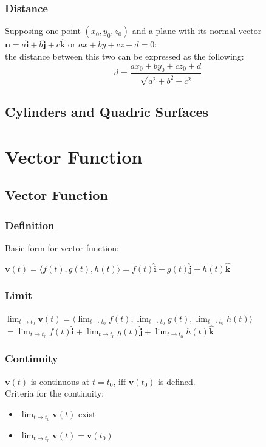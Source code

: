 \documentclass[UTF8,a4paper, 10pt, openany]{book}
\begin{document}
\subsection{Distance}
Supposing one point $(x_0,y_0,z_0)$ and a plane with its normal vector $\mathbf{n}=a\mathbf{\hat{i}}+b\mathbf{\hat{j}}+c\mathbf{\hat{k}}$ or $ax+by+cz+d=0$:\\
the distance between this two can be expressed as the following:
\begin{equation}
\boxed{d=\dfrac{ax_0+by_0+cz_0+d}{\sqrt{a^2+b^2+c^2}}}
\end{equation}

\section{Cylinders and Quadric Surfaces}

\chapter{Vector Function}
\section{Vector Function}
\subsection{Definition}
Basic form for vector function:
\begin{center}
$\mathbf{v}(t)=\langle f(t),g(t),h(t)\rangle=f(t)\mathbf{\hat{i}}+g(t)\mathbf{\hat{j}}+h(t)\mathbf{\hat{k}}$
\end{center}
\subsection{Limit}
\begin{center}
$\displaystyle	\lim_{t \to t_0} \mathbf{v}(t) = \langle\displaystyle\lim_{t \to t_0}f(t),\displaystyle\lim_{t \to t_0}g(t),\displaystyle\lim_{t \to t_0}h(t)	\rangle$\\
$=\displaystyle\lim_{t \to t_0}f(t)\mathbf{\hat{i}}+\displaystyle\lim_{t \to t_0}g(t)\mathbf{\hat{j}}+\displaystyle\lim_{t \to t_0}h(t)\mathbf{\hat{k}}$
\end{center}
\subsection{Continuity}
$\mathbf{v}(t)$ is continuous at $t=t_0$, iff $\mathbf{v}(t_0)$ is defined.\\
Criteria for the continuity:
\begin{itemize}
\item $\displaystyle\lim_{t \to t_0} \mathbf{v}(t)$ exist
\item $\displaystyle\lim_{t \to t_0} \mathbf{v}(t)=\mathbf{v}(t_0)$
\end{itemize}
\end{document}
